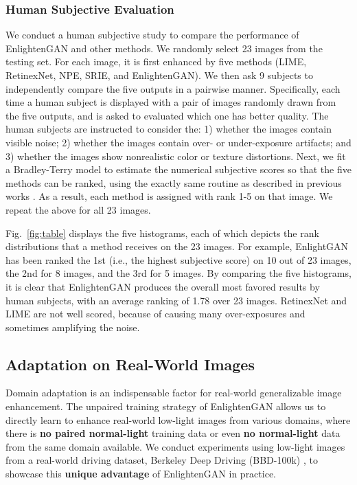 \documentclass[journal]{IEEEtran}
\begin{document}
\subsubsection{Human Subjective Evaluation}\label{subjective}
We conduct a human subjective study to compare the performance of EnlightenGAN and other methods. We randomly select 23 images from the testing set. For each image, it is first enhanced by five methods (LIME, RetinexNet, NPE, SRIE, and EnlightenGAN). We then ask 9 subjects to independently compare the five outputs in a pairwise manner. Specifically, each time a human subject is displayed with a pair of images randomly drawn from the five outputs, and is asked to evaluated which one has better quality. The human subjects are instructed to consider the: 1) whether the images contain visible noise; 2) whether the images contain over- or under-exposure artifacts; and 3) whether the images show nonrealistic color or texture distortions. Next, we fit a Bradley-Terry model  \cite{bradley1952rank} to estimate the numerical subjective scores so that the five methods can be ranked, using the exactly same routine as described in previous works \cite{li2019benchmarking}. As a result, each method is assigned with rank 1-5 on that image. We repeat the above for all 23 images.







Fig.~\ref{fig:table} displays the five histograms, each of which depicts the rank distributions that a method receives on the 23 images. For example, EnlightGAN has been ranked the 1st (i.e., the highest subjective score) on 10 out of 23 images, the 2nd for 8 images, and the 3rd for 5 images. By comparing the five histograms, it is clear that EnlightenGAN produces the overall most favored results by human subjects, with an average ranking of 1.78 over 23 images. RetinexNet and LIME are not well scored, because of causing many over-exposures and sometimes amplifying the noise.










\subsection{Adaptation on Real-World Images}
\label{bbd}

Domain adaptation is an indispensable factor for real-world generalizable image enhancement. 
The unpaired training strategy of EnlightenGAN allows us to directly learn to enhance real-world low-light images from various domains, where there is \textbf{no paired normal-light} training data or even \textbf{no normal-light} data from the same domain available. We conduct experiments using low-light images from a real-world driving dataset, Berkeley Deep Driving (BBD-100k) \cite{yu2018bdd100k}, to showcase this \textbf{unique advantage} of EnlightenGAN in practice.
\end{document}

